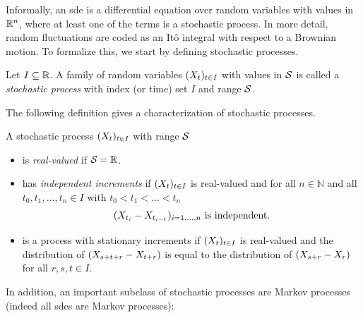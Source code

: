 Informally, an \gls{sde} is a differential equation over random variables with values in \( \mathbb{R}^n \), where at least one of the terms is a stochastic process.
In more detail, random fluctuations are coded as an Itô integral with respect to a Brownian motion.
To formalize this, we start by defining stochastic processes.
\begin{definition}%
	\label{def:stochastic process}
	Let \( I \subseteq \mathbb{R} \).
	A family of random variables \( (X_t)_{t \in I} \) with values in \( \mathcal{S} \) is called a \emph{stochastic process} with index (or time) set \( I \) and range \( \mathcal{S} \).
\end{definition}
The following definition gives a characterization of stochastic processes.
\begin{definition}%
	\label{def:independent increments}
	A stochastic process \( (X_t)_{t\in I} \) with range \( \mathcal{S} \)
	\begin{itemize}
		\item is \emph{real-valued} if \( \mathcal{S} = \mathbb{R} \).
		\item has \emph{independent increments} if \( (X_t)_{t\in I} \) is real-valued and for all \( n \in \mathbb{N} \) and all \( t_{\num{0}}, t_{\num{1}}, \dotsc, t_n \in I \) with \( t_{\num{0}} < t_{\num{1}} < \ldots < t_n \)
			\begin{equation}
				(X_{t_i} - X_{t_{i-\num{1}}})_{i=\num{1},\dotsc,n} \text{ is independent}.
			\end{equation}
		\item is a process with stationary increments if \( (X_t)_{t\in I} \) is real-valued and the distribution of \( (X_{s+t+r} - X_{t+r}) \) is equal to the distribution of \( (X_{s+r} - X_{r}) \) for all \( r, s, t \in I \).
	\end{itemize}
\end{definition}
In addition, an important subclass of stochastic processes are Markov processes (indeed all \glspl{sde} are Markov processes):
